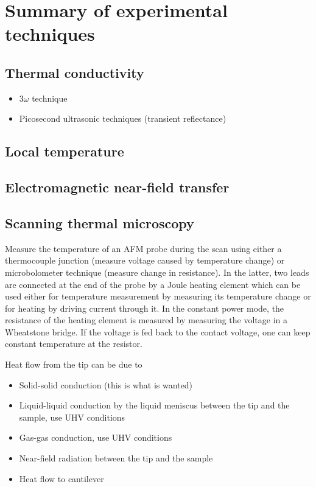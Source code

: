 

\iffalse
\section{Summary of experimental techniques}

\subsection{Thermal conductivity}

\begin{itemize}
 \item $3\omega$ technique
 \item Picosecond ultrasonic techniques (transient reflectance)
\end{itemize}

\subsection{Local temperature}

\subsection{Electromagnetic near-field transfer}

\subsection{Scanning thermal microscopy}

Measure the temperature of an AFM probe during the scan using either a thermocouple junction (measure voltage caused by temperature change) or microbolometer technique (measure change in resistance). In the latter, two leads are connected at the end of the probe by a Joule heating element which can be used either for temperature measurement by measuring its temperature change or for heating by driving current through it. In the constant power mode, the resistance of the heating element is measured by measuring the voltage in a Wheatstone bridge. If the voltage is fed back to the contact voltage, one can keep constant temperature at the resistor. 

Heat flow from the tip can be due to
\begin{itemize}
 \item Solid-solid conduction (this is what is wanted)
 \item Liquid-liquid conduction by the liquid meniscus between the tip and the sample, use UHV conditions
 \item Gas-gas conduction, use UHV conditions
 \item Near-field radiation between the tip and the sample
 \item Heat flow to cantilever
\end{itemize}

